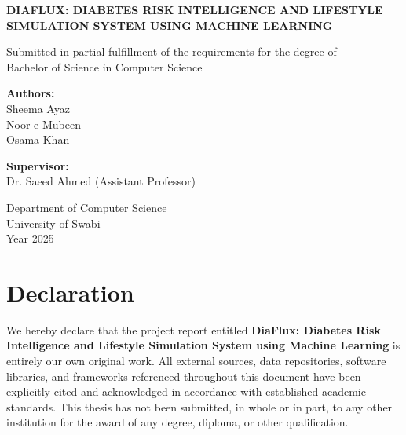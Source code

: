 \documentclass[12pt,a4paper]{report}
\begin{document}
\onehalfspacing
{}

\begin{titlepage}
    \begin{center}
        \vspace*{1cm}
        \Huge
        \textbf{DIAFLUX: DIABETES RISK INTELLIGENCE AND LIFESTYLE SIMULATION SYSTEM USING MACHINE LEARNING}

        \vspace{2.5cm}
        \large
        Submitted in partial fulfillment of the requirements for the degree of\\
        Bachelor of Science in Computer Science

        \vspace{2.5cm}
        \textbf{Authors:}\\
        Sheema Ayaz\\
        Noor e Mubeen\\
        Osama Khan

        \vspace{2.5cm}
        \textbf{Supervisor:}\\
        Dr. Saeed Ahmed (Assistant Professor)

        \vspace{2.5cm}
        \large
        Department of Computer Science\\
        University of Swabi\\
        Year 2025
    \end{center}
\end{titlepage}

\clearpage

\chapter*{Declaration}
We hereby declare that the project report entitled \textbf{DiaFlux: Diabetes Risk Intelligence and Lifestyle Simulation System using Machine Learning} is entirely our own original work. All external sources, data repositories, software libraries, and frameworks referenced throughout this document have been explicitly cited and acknowledged in accordance with established academic standards. This thesis has not been submitted, in whole or in part, to any other institution for the award of any degree, diploma, or other qualification.
\end{document}
